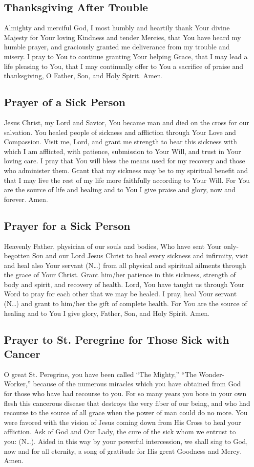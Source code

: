 \documentclass[12pt]{article}
\newcommand{\prayertitle}[1]{\subsection{#1}}
\newcommand{\insertname}{(N\dots)\xspace}
\begin{document}
\prayertitle{Thanksgiving After Trouble}
Almighty and merciful God, I most humbly and heartily thank Your divine Majesty for Your loving Kindness and tender Mercies, that You have heard my humble prayer, and graciously granted me deliverance from my trouble and misery.
I pray to You to continue granting Your helping Grace, that I may lead a life pleasing to You, that I may continually offer to You a sacrifice of praise and thanksgiving, O Father, Son, and Holy Spirit.
Amen.

\prayertitle{Prayer of a Sick Person}
Jesus Christ, my Lord and Savior, You became man and died on the cross for our salvation.
You healed people of sickness and affliction through Your Love and Compassion.
Visit me, Lord, and grant me strength to bear this sickness with which I am afflicted, with patience, submission to Your Will, and trust in Your loving care.
I pray that You will bless the means used for my recovery and those who administer them.
Grant that my sickness may be to my spiritual benefit and that I may live the rest of my life more faithfully according to Your Will.
For You are the source of life and healing and to You I give praise and glory, now and forever.
Amen.

\prayertitle{Prayer for a Sick Person}
Heavenly Father, physician of our souls and bodies, Who have sent Your only-begotten Son and our Lord Jesus Christ to heal every sickness and infirmity, visit and heal also Your servant \insertname from all physical and spiritual ailments through the grace of Your Christ.
Grant him/her patience in this sickness, strength of body and spirit, and recovery of health.
Lord, You have taught us through Your Word to pray for each other that we may be healed.
I pray, heal Your servant \insertname and grant to him/her the gift of complete health.
For You are the source of healing and to You I give glory, Father, Son, and Holy Spirit.
Amen.

\prayertitle{Prayer to St. Peregrine for Those Sick with Cancer}
O great St. Peregrine, you have been called ``The Mighty,'' ``The Wonder-Worker,'' because of the numerous miracles which you have obtained from God for those who have had recourse to you.
For so many years you bore in your own flesh this cancerous disease that destroys the very fiber of our being, and who had recourse to the source of all grace when the power of man could do no more.
You were favored with the vision of Jesus coming down from His Cross to heal your affliction.
Ask of God and Our Lady, the cure of the sick whom we entrust to you: \insertname.
Aided in this way by your powerful intercession, we shall sing to God, now and for all eternity, a song of gratitude for His great Goodness and Mercy.
Amen.
\end{document}
